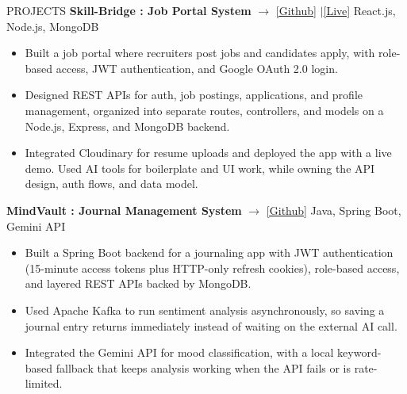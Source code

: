 \documentclass{resume}
\begin{document}
\begin{rSection}{PROJECTS}
\vspace{-2pt}
\textbf{Skill-Bridge : Job Portal System} $\rightarrow$
\href{https://github.com/Chinmay0608/job-portal-system}{[Github]}
$|$\hspace{5pt}\href{https://job-portal-system-alpha.vercel.app/}{[Live]}
\hfill {React.js, Node.js, MongoDB}
\begin{itemize}[leftmargin=*, itemsep=-3pt, topsep=0pt]
\item Built a job portal where recruiters post jobs and candidates apply, with role-based access, JWT authentication,
and Google OAuth 2.0 login.
\item Designed REST APIs for auth, job postings, applications, and profile management, organized into separate
routes, controllers, and models on a Node.js, Express, and MongoDB backend.
\item Integrated Cloudinary for resume uploads and deployed the app with a live demo. Used AI tools for boilerplate
and UI work, while owning the API design, auth flows, and data model.
\end{itemize}
\vspace{2pt}
\textbf{MindVault : Journal Management System} $\rightarrow$
\href{https://github.com/Chinmay0608/MindVault}{[Github]}
\hfill {Java, Spring Boot, Gemini API}
\begin{itemize}[leftmargin=*, itemsep=-3pt, topsep=0pt]
\item Built a Spring Boot backend for a journaling app with JWT authentication (15-minute access tokens plus
HTTP-only refresh cookies), role-based access, and layered REST APIs backed by MongoDB.
\item Used Apache Kafka to run sentiment analysis asynchronously, so saving a journal entry returns immediately
instead of waiting on the external AI call.
\item Integrated the Gemini API for mood classification, with a local keyword-based fallback that keeps analysis
working when the API fails or is rate-limited.
\end{itemize}
\vspace{-4pt}
\end{rSection}
\end{document}
